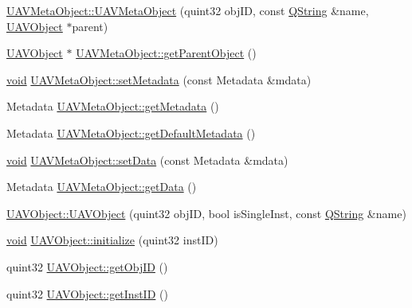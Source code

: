 \begin{DoxyCompactItemize}
\item 
\hyperlink{group___u_a_v_objects_plugin_ga82e8ae42383522ae0507b881d11abba5}{\-U\-A\-V\-Meta\-Object\-::\-U\-A\-V\-Meta\-Object} (quint32 obj\-I\-D, const \hyperlink{group___u_a_v_objects_plugin_gab9d252f49c333c94a72f97ce3105a32d}{\-Q\-String} \&name, \hyperlink{class_u_a_v_object}{\-U\-A\-V\-Object} $\ast$parent)
\item 
\hyperlink{class_u_a_v_object}{\-U\-A\-V\-Object} $\ast$ \hyperlink{group___u_a_v_objects_plugin_gabfdc167657f1b0eae61e412313785e7b}{\-U\-A\-V\-Meta\-Object\-::get\-Parent\-Object} ()
\item 
\hyperlink{group___u_a_v_objects_plugin_ga444cf2ff3f0ecbe028adce838d373f5c}{void} \hyperlink{group___u_a_v_objects_plugin_ga714e256632f9fbd0aba5c6a9aaae422a}{\-U\-A\-V\-Meta\-Object\-::set\-Metadata} (const \-Metadata \&mdata)
\item 
\-Metadata \hyperlink{group___u_a_v_objects_plugin_ga3830028095cc0fceed15e72baae231d9}{\-U\-A\-V\-Meta\-Object\-::get\-Metadata} ()
\item 
\-Metadata \hyperlink{group___u_a_v_objects_plugin_ga151811823619af6a7231118c8e64f843}{\-U\-A\-V\-Meta\-Object\-::get\-Default\-Metadata} ()
\item 
\hyperlink{group___u_a_v_objects_plugin_ga444cf2ff3f0ecbe028adce838d373f5c}{void} \hyperlink{group___u_a_v_objects_plugin_ga442400ff0a37c73b50d6e5ad9533ace4}{\-U\-A\-V\-Meta\-Object\-::set\-Data} (const \-Metadata \&mdata)
\item 
\-Metadata \hyperlink{group___u_a_v_objects_plugin_gaa60fd952fa89a624b43ba3dcf4a7c953}{\-U\-A\-V\-Meta\-Object\-::get\-Data} ()
\item 
\hyperlink{group___u_a_v_objects_plugin_gafee3b68612b44afbe6dd82f663126f09}{\-U\-A\-V\-Object\-::\-U\-A\-V\-Object} (quint32 obj\-I\-D, bool is\-Single\-Inst, const \hyperlink{group___u_a_v_objects_plugin_gab9d252f49c333c94a72f97ce3105a32d}{\-Q\-String} \&name)
\item 
\hyperlink{group___u_a_v_objects_plugin_ga444cf2ff3f0ecbe028adce838d373f5c}{void} \hyperlink{group___u_a_v_objects_plugin_ga1ed2d21fdcea1cc31ebc6c669ba49720}{\-U\-A\-V\-Object\-::initialize} (quint32 inst\-I\-D)
\item 
quint32 \hyperlink{group___u_a_v_objects_plugin_gaad45ab83a511083bfe60df0c244e9b88}{\-U\-A\-V\-Object\-::get\-Obj\-I\-D} ()
\item 
quint32 \hyperlink{group___u_a_v_objects_plugin_gaf465e2bde7a1e41ba94c19eac2ba9b80}{\-U\-A\-V\-Object\-::get\-Inst\-I\-D} ()
\item 

\end{DoxyCompactItemize}
